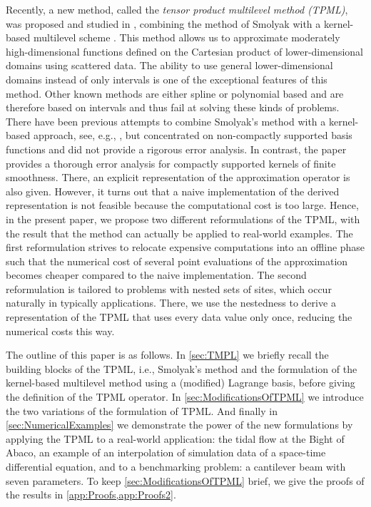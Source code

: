 \documentclass[	a4paper, 
								11pt]{article}
\theoremstyle{plain}
\begin{document}
 Recently, a new method, called the \emph{tensor product multilevel method (TPML)}, was proposed and studied in \cite{kempf:TPML}, combining the method of Smolyak with a kernel-based multilevel scheme \cite{wendland:multilevel}. This method allows us to approximate moderately high-dimensional functions defined on the Cartesian product of lower-dimensional domains using scattered data. The ability to use general lower-dimensional domains instead of only intervals is one of the exceptional features of this method. Other known methods are either spline or polynomial based and are therefore based on intervals and thus fail at solving these kinds of problems. There have been previous attempts to combine Smolyak's method with a kernel-based approach, see, e.g., \cite{levesley:MultilevelSparseKernelInterpolation}, but concentrated on non-compactly supported basis functions and did not provide a rigorous error analysis. In contrast, the paper \cite{kempf:TPML} provides a thorough error analysis for compactly supported kernels of finite smoothness. There, an explicit representation of the approximation operator is also given. However, it turns out that a naive implementation of the derived representation is not feasible because the computational cost is too large. Hence, in the present paper, we propose two different reformulations of the TPML, with the result that the method can actually be applied to real-world examples. The first reformulation strives to relocate expensive computations into an offline phase such that the numerical cost of several point evaluations of the approximation becomes cheaper compared to the naive implementation. The second reformulation is tailored to problems with nested sets of sites, which occur naturally in typically applications. There, we use the nestedness to derive a representation of the TPML that uses every data value only once, reducing the numerical costs this way.

The outline of this paper is as follows. In \cref{sec:TMPL} we briefly recall the building blocks of the TPML, i.e., Smolyak's method and the formulation of the kernel-based multilevel method using a (modified) Lagrange basis, before giving the definition of the TPML operator. In \cref{sec:ModificationsOfTPML} we introduce the two variations of the formulation of TPML. And finally in \cref{sec:NumericalExamples} we demonstrate the power of the new formulations by applying the TPML to a real-world application: the tidal flow at the Bight of Abaco, an example of an interpolation of simulation data of a space-time differential equation, and to a benchmarking problem: a cantilever beam with seven parameters. To keep \cref{sec:ModificationsOfTPML} brief, we give the proofs of the results in \cref{app:Proofs,app:Proofs2}.
\end{document}

